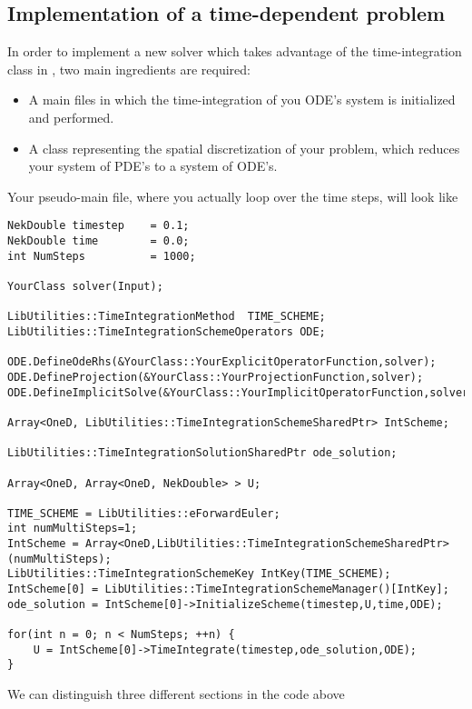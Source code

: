 \subsection{Implementation of a time-dependent problem}
In order to implement a new solver which takes advantage of the
time-integration class in {\nek}, two main ingredients are required:
\begin{itemize}
\item A main files in which the time-integration of you ODE's system is
initialized and performed.
\item A class representing the spatial discretization of your problem, which
reduces your system of PDE's to a system of ODE's.
\end{itemize}

Your pseudo-main file, where you actually loop over the time steps, will look
like
\begin{lstlisting}[style=C++Style]
NekDouble timestep    = 0.1; 
NekDouble time        = 0.0; 
int NumSteps          = 1000;

YourClass solver(Input);
    
LibUtilities::TimeIntegrationMethod  TIME_SCHEME;
LibUtilities::TimeIntegrationSchemeOperators ODE;

ODE.DefineOdeRhs(&YourClass::YourExplicitOperatorFunction,solver);
ODE.DefineProjection(&YourClass::YourProjectionFunction,solver);
ODE.DefineImplicitSolve(&YourClass::YourImplicitOperatorFunction,solver);
    
Array<OneD, LibUtilities::TimeIntegrationSchemeSharedPtr> IntScheme;
    
LibUtilities::TimeIntegrationSolutionSharedPtr ode_solution;
    
Array<OneD, Array<OneD, NekDouble> > U;

TIME_SCHEME = LibUtilities::eForwardEuler; 
int numMultiSteps=1; 
IntScheme = Array<OneD,LibUtilities::TimeIntegrationSchemeSharedPtr>(numMultiSteps); 
LibUtilities::TimeIntegrationSchemeKey IntKey(TIME_SCHEME); 
IntScheme[0] = LibUtilities::TimeIntegrationSchemeManager()[IntKey]; 
ode_solution = IntScheme[0]->InitializeScheme(timestep,U,time,ODE);

for(int n = 0; n < NumSteps; ++n) {
    U = IntScheme[0]->TimeIntegrate(timestep,ode_solution,ODE);
}
\end{lstlisting}

We can distinguish three different sections in the code above

